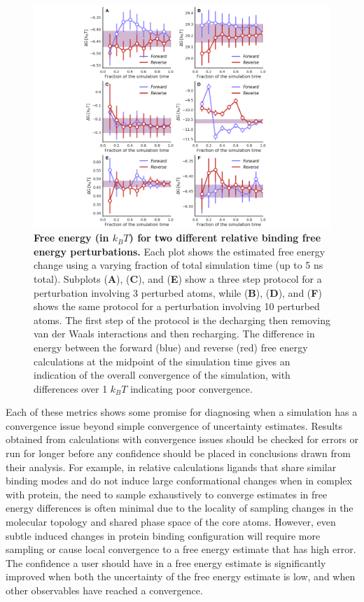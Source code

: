 \documentclass[9pt,bestpractices,pubversion]{livecoms}
\begin{document}
\begin{figure}
    \centering
    \includegraphics[width=0.95\linewidth]{figures/fig10_forward_reverse/Figure.pdf}
    \caption{\textbf{Free energy (in $k_{B}T$) for two different relative binding free energy perturbations.} 
    Each plot shows the estimated free energy change using a varying fraction of total simulation time (up to 5 ns total). 
    Subplots (\textbf{A}), (\textbf{C}), and (\textbf{E}) show a three step protocol for a perturbation involving 3 perturbed atoms, while (\textbf{B}), (\textbf{D}), and (\textbf{F}) shows the same protocol for a perturbation involving 10 perturbed atoms. The first step of the protocol is the decharging then removing van der Waals interactions and then recharging. The difference in energy between the forward (blue) and reverse (red) free energy calculations at the midpoint of the simulation time gives an indication of the overall convergence of the simulation, with differences over 1 $k_{B}T$ indicating poor convergence.}
    \label{fig:convergence_forward_reverse}
\end{figure}

Each of these metrics shows some promise for diagnosing when a simulation has a convergence issue beyond simple convergence of uncertainty estimates. 
Results obtained from calculations with convergence issues should be checked for errors or run for longer before any confidence should be placed in conclusions drawn from their analysis.
For example, in relative calculations ligands that share similar binding modes and do not induce large conformational changes when in complex with protein, the need to sample exhaustively to converge estimates in free energy differences is often minimal due to the locality of sampling changes in the molecular topology and shared phase space of the core atoms.
However, even subtle induced changes in protein binding configuration will require more sampling or cause local convergence to a free energy estimate that has high error.
The confidence a user should have in a free energy estimate is significantly improved when both the uncertainty of the free energy estimate is low, and when other observables have reached a convergence.
\end{document}
